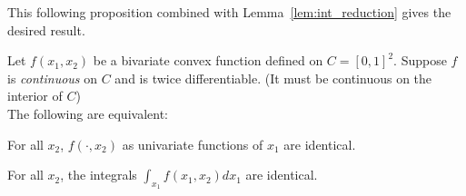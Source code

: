 \documentclass{article}
\begin{document}
This following proposition combined with Lemma~\ref{lem:int_reduction} gives the desired result.

\begin{proposition}
Let $f(x_1, x_2)$ be a bivariate convex function defined on $C = [0,1]^2$. Suppose $f$ is \emph{continuous} on $C$ and is twice differentiable. (It must be continuous on the interior of $C$) \\

The following are equivalent:
\begin{packed_enum}
\item For all $x_2$, $f(\cdot, x_2)$ as univariate functions of $x_1$ are identical.
\item For all $x_2$, the integrals $\int_{x_1} f(x_1, x_2) d x_1$ are identical.
\end{packed_enum}
\end{proposition}
\end{document}
